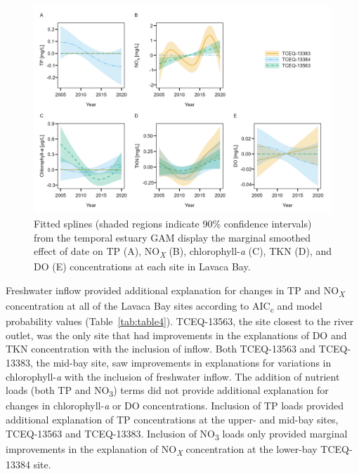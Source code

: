 \documentclass[fleqn,10pt,lineno]{wlpeerj} %
\begin{document}
\begin{figure}

{\centering \includegraphics[width=1\linewidth,]{Schramm-2023-06-PeerJ_files/figure-latex/fig5-1} 

}

\caption{Fitted splines (shaded regions indicate 90\% confidence intervals) from the temporal estuary GAM display the marginal smoothed effect of date on TP (A), NO\textit{\textsubscript{X}} (B), chlorophyll-\textit{a} (C), TKN (D), and DO (E) concentrations at each site in Lavaca Bay.}\label{fig:fig5}
\end{figure}

Freshwater inflow provided additional explanation for changes in TP and
NO\textsubscript{\emph{X}} concentration at all of the Lavaca Bay sites
according to AIC\textsubscript{c} and model probability values
(Table~\ref{tab:table4}). TCEQ-13563, the site closest to the river
outlet, was the only site that had improvements in the explanations of
DO and TKN concentration with the inclusion of inflow. Both TCEQ-13563
and TCEQ-13383, the mid-bay site, saw improvements in explanations for
variations in chlorophyll-\emph{a} with the inclusion of freshwater
inflow. The addition of nutrient loads (both TP and NO\textsubscript{3})
terms did not provide additional explanation for changes in
chlorophyll-\emph{a} or DO concentrations. Inclusion of TP loads
provided additional explanation of TP concentrations at the upper- and
mid-bay sites, TCEQ-13563 and TCEQ-13383. Inclusion of
NO\textsubscript{3} loads only provided marginal improvements in the
explanation of NO\textsubscript{\emph{X}} concentration at the lower-bay
TCEQ-13384 site.
\end{document}
